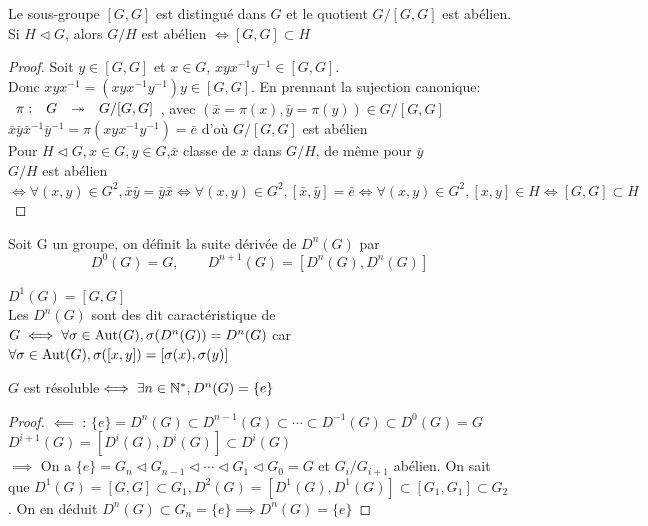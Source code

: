\documentclass[]{report}
\begin{document}
    \begin{prop}{}{}
        Le sous-groupe $[G,G]$ est distingué dans $G$ et le quotient $G/[G,G]$ est abélien.\\
        Si $H\triangleleft G$, alors $G/H$ est abélien $\iff[G,G]\subset H$
    \end{prop}

    \begin{proof}
        Soit $y\in[G,G]$ et $x\in G$, $xyx^{-1}y^{-1}\in[G,G]$.\\
        Donc $xyx^{-1}=(xyx^{-1}y^{-1})y\in[G,G]$. En prennant la sujection canonique: $\begin{array}{ccccc} \pi : & G & \twoheadrightarrow & G/[G,G] \end{array}$, avec $(\bar{x}=\pi(x),\bar{y}=\pi(y))\in G/[G,G]$\\
        $\bar{x}\bar{y}\bar{x}^{-1}\bar{y}^{-1}=\pi(xyx^{-1}y^{-1})=\bar{e}$ d'où $G/[G,G]$ est abélien\\
        Pour $H\triangleleft G,x\in G,y\in G$,$\bar{x}$ classe de $x$ dans $G/H$, de même pour $\bar{y}$\\
        $G/H$ est abélien $\iff\forall (x,y)\in G^2,\bar{x}\bar{y}=\bar{y}\bar{x}\iff\forall (x,y)\in G^2,[\bar{x},\bar{y}]=\bar{e}\iff\forall (x,y)\in G^2,[x,y]\in H\iff[G,G]\subset H$
    \end{proof}

    \begin{df}
        Soit G un groupe, on définit la suite dérivée de \sgs $D^n(G)$ par
        \[D^0(G)=G,\qquad D^{n+1}(G)=[D^n(G),D^n(G)]\]
    \end{df}

    \begin{re}{}{}
        $D^1(G)=[G,G]$\\
        Les $D^n(G)$ sont des \sgs dit caractéristique de $G\iff\forall\sigma\in\text{Aut}(G),\sigma(D^n(G))=D^n(G)$ car $\forall\sigma\in\text{Aut}(G),\sigma([x,y])=[\sigma(x),\sigma(y)]$
    \end{re}

    \begin{prop}{}{}
        $G$ est résoluble$\iff\exists n\in\mathbb{N}^*,D^n(G)=\{e\}$
    \end{prop}

    \begin{proof}
        $\impliedby$ : $\{e\}=D^n(G)\subset D^{n-1}(G)\subset \cdots \subset D^{-1}(G)\subset D^0(G)=G$\\
        $D^{i+1}(G)=[D^i(G),D^i(G)]\subset D^i(G)$\\
        $\implies$ On a $\{e\}=G_n\triangleleft G_{n-1}\triangleleft\cdots\triangleleft G_1\triangleleft G_0=G$ et $G_i/G_{i+1}$ abélien. On sait que $D^1(G)=[G,G]\subset G_1,D^2(G)=[D^1(G),D^1(G)]\subset[G_1,G_1]\subset G_2$. On en déduit $D^n(G)\subset G_n=\{e\}\implies D^n(G)=\{e\}$
    \end{proof}
\end{document}
